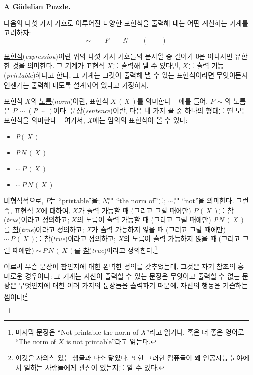 \documentclass[12pt]{paper}
\newenvironment{context}[1][]
{ \noindent \textbf{{#1}.}
}
{ \hfill $ \dashv $
}
\begin{document}
\begin{context}[A G\"odelian Puzzle]
다음의 다섯 가지 기호로 이루어진 다양한 표현식을 출력해 내는 어떤 계산하는 기계를 고려하자:
$$ \sim \qquad P \qquad N \qquad \left( \right. \qquad \left. \right) $$

\underline{표현식}(\textit{expression})이란 위의 다섯 가지 기호들의 문자열 중 길이가 $0$은 아니지만 유한한 것을 의미한다.
그 기계가 표현식 $X$를 출력해 낼 수 있다면,
$X$를 \underline{출력 가능}(\textit{printable})하다고 한다.
그 기계는 그것이 출력해 낼 수 있는 표현식이라면 무엇이든지 언젠가는 출력해 내도록 설계되어 있다고 가정하자.

표현식 $X$의 \underline{노름}(\textit{norm})이란,
표현식 $X \, \left( \, X \, \right)$를 의미한다 --
예를 들어, $P \, \sim$의 노름은 $P \, \sim \left( P \, \sim \right)$이다.
\underline{문장}(\textit{sentence})이란, 다음 네 가지 꼴 중 하나의 형태를 띤 모든 표현식을 의미한다 --
여기서, $X$에는 임의의 표현식이 올 수 있다:
\begin{itemize}
\item[(1)] $P \left( \, X \, \right)$
\item[(2)] $P \, N \, \left( \, X \, \right)$
\item[(3)] $\sim \, P \, \left( \, X \, \right)$
\item[(4)] $\sim \, P \, N \, \left( \, X \, \right)$   
\end{itemize}

비형식적으로, $P$는 ``printable''을; $N$은 ``the norm of''를; $\sim$은 ``not''을 의미한다.
그런즉, 표현식 $X$에 대하여,
$X$가 출력 가능할 때 (그리고 그럴 때에만) $P \, \left( \, X \, \right)$를 \underline{참}(\textit{true})이라고 정의하고;
$X$의 노름이 출력 가능할 때 (그리고 그럴 때에만) $P \, N \, \left( \, X \, \right)$를 \underline{참}(\textit{true})이라고 정의하고;
$X$가 출력 가능하지 않을 때 (그리고 그럴 때에만) $\sim \, P \, \left( \, X \, \right)$를 \underline{참}(\textit{true})이라고 정의하고;
$X$의 노름이 출력 가능하지 않을 때 (그리고 그럴 때에만) $\sim \, P \, N \, \left( \, X \, \right)$를 \underline{참}(\textit{true})이라고 정의한다.\footnote
{
마지막 문장은 ``Not printable the norm of $X$''라고 읽거나,
혹은 더 좋은 영어로 ``The norm of $X$ is not printable''라고 읽는다.
}

이로써 무슨 문장이 참인지에 대한 완벽한 정의를 갖추었는데,
그것은 자기 참조의 흥미로운 경우이다:
그 기계는 자신이 출력할 수 있는 문장은 무엇이고 출력할 수 없는 문장은 무엇인지에 대한 여러 가지의 문장들을 출력하기 때문에,
자신의 행동을 기술하는 셈이다!\footnote
{
이것은 자의식 있는 생물과 다소 닮았다.
또한 그러한 컴퓨들이 왜 인공지능 분야에서 일하는 사람들에게 관심이 있는지를 알 수 있다.
}


\end{context}
\end{document}
